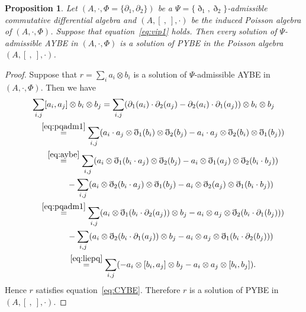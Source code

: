 \documentclass[pdftex]{sigma}
\numberwithin{equation}{section}
\newtheorem{Proposition}[Theorem]{Proposition}
{ \theoremstyle{definition}
	\newtheorem{Definition}[Theorem]{Definition}
	\newtheorem{Note}[Theorem]{Note}
	\newtheorem{Example}[Theorem]{Example}
	\newtheorem{Remark}[Theorem]{Remark} }
\begin{document}
\begin{Proposition}\label{pro:aybe_to_qybe}
 Let $(A, \cdot, \Phi = \{\partial_1, \partial_2\})$ be a $\Psi = \{\eth_1, \eth_2\}$-admissible commutative differential algebra and $(A, [\ ,\ ], \cdot)$ be the induced Poisson algebra of $(A, \cdot, \Phi)$.
 Suppose that equation~\eqref{eq:vip1} holds.
 Then every solution of $\Psi$-admissible AYBE in $(A, \cdot, \Phi)$ is a solution of PYBE in the Poisson algebra $(A, [\ ,\ ], \cdot)$.
\end{Proposition}
\begin{proof}
 Suppose that $r = \sum_i a_i \otimes b_i$ is a solution of $\Psi$-admissible AYBE in $(A, \cdot, \Phi)$.
 Then we have
 \begin{gather*}
 \sum_{i,j}[a_i,a_j] \otimes b_i \otimes b_j = \sum_{i,j}(\partial_1(a_i) \cdot \partial_2(a_j) - \partial_2(a_i) \cdot \partial_1(a_j)) \otimes b_i \otimes b_j\\
 \qquad{} \overset{\eqref{eq:pqadm1}}{=} \sum_{i,j}( a_i \cdot a_j \otimes \eth_1(b_i) \otimes \eth_2(b_j) - a_i \cdot a_j \otimes \eth_2(b_i) \otimes \eth_1(b_j) )\\
 \qquad{} \overset{\eqref{eq:aybe}}{=} \sum_{i,j}( a_i \otimes \eth_1(b_i \cdot a_j) \otimes \eth_2(b_j) - a_i \otimes \eth_1(a_j) \otimes \eth_2(b_i \cdot b_j)) \\
 \qquad\qquad {}- \sum_{i,j}( a_i \otimes \eth_2(b_i \cdot a_j) \otimes \eth_1(b_j) - a_i \otimes \eth_2(a_j) \otimes \eth_1(b_i \cdot b_j) )\\
 \qquad{} \overset{\eqref{eq:pqadm1}}{=} \sum_{i,j}( a_i \otimes \eth_1(b_i \cdot \partial_2(a_j)) \otimes b_j - a_i \otimes a_j \otimes \eth_2(b_i \cdot \partial_1(b_j))) \\
 \qquad\qquad {}- \sum_{i,j}(a_i \otimes \eth_2(b_i \cdot \partial_1(a_j)) \otimes b_j - a_i \otimes a_j \otimes \eth_1(b_i \cdot \partial_2(b_j)) )\\
 \qquad{} \overset{\eqref{eq:liepq}}{=} \sum_{i,j}( -a_i \otimes [b_i, a_j] \otimes b_j - a_i \otimes a_j \otimes [b_i,b_j]).
 \end{gather*}
 Hence $r$ satisfies equation~\eqref{eq:CYBE}.
 Therefore $r$ is a solution of PYBE in $(A, [\ ,\ ], \cdot)$.
\end{proof}
\end{document}
